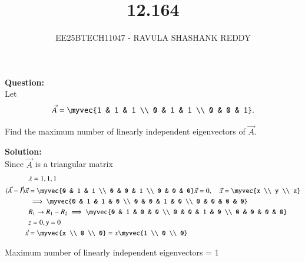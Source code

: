 \documentclass[journal]{article}
\begin{document}
	
	
	\vspace{3cm}
	
\title{12.164}
\author{EE25BTECH11047 - RAVULA SHASHANK REDDY}
\maketitle
\hrulefill
\bigskip 

\renewcommand{\thetable}{\theenumi}
\setlength{\intextsep}{10pt}

\textbf{Question:} \\

Let 
\begin{align*}
\vec{A} = \myvec{1 & 1 & 1 \\ 0 & 1 & 1 \\ 0 & 0 & 1}.
\end{align*}

Find the maximum number of linearly independent eigenvectors of \(\vec{A}\).

\textbf{Solution:}\\

Since $\vec{A}$ is a triangular matrix
\begin{align}
 & \lambda = 1,1,1 \\
(\vec{A} - \vec{I})\vec{x} &= \myvec{0 & 1 & 1 \\ 0 & 0 & 1 \\ 0 & 0 & 0} \vec{x} = 0, \quad \vec{x} = \myvec{x \\ y \\ z} \\
&\implies \myvec{0 & 1 & 1 & 0 \\ 0 & 0 & 1 & 0 \\ 0 & 0 & 0 & 0}\\
&R_1\rightarrow{R_1-R_2}\implies \myvec{0 & 1 & 0 & 0 \\ 0 & 0 & 1 & 0 \\ 0 & 0 & 0 & 0}\\
& z = 0 , y = 0 \\
\vec{x} &= \myvec{x \\ 0 \\ 0} = x \myvec{1 \\ 0 \\ 0}
\end{align}


Maximum number of linearly independent eigenvectors = 1
\end{document}
